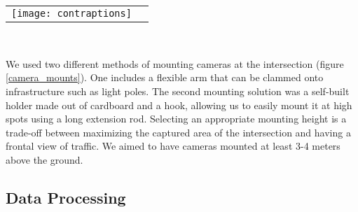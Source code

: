 \ \\





\ \\ 
\raggedbottom
\begin{tabular}{@{}cc}
\texttt{[image: contraptions]}
\end{tabular}
\label{camera_mounts}
\

We used two different methods of mounting cameras at the intersection (figure \ref{camera_mounts}). One includes a flexible arm that can be clammed onto infrastructure such as light poles.
The second mounting solution was a self-built holder made out of cardboard and a hook, allowing us to easily mount it at high spots using a long extension rod.
Selecting an appropriate mounting height is a trade-off between maximizing the captured area of the intersection and having a frontal view of traffic.
We aimed to have cameras mounted at least 3-4 meters above the ground.

\subsection{Data Processing}
\ \\ 

